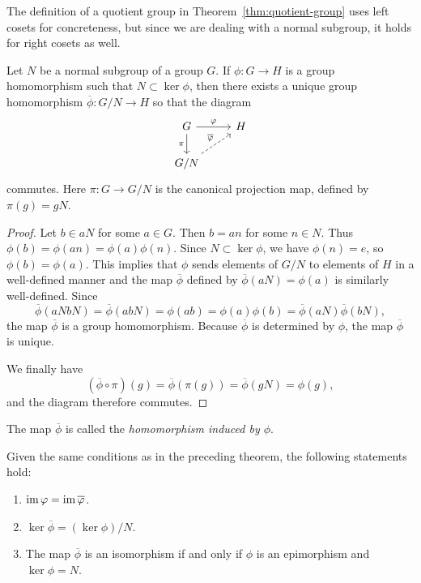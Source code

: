 \begin{remark}
    The definition of a quotient group in Theorem~\ref{thm:quotient-group} uses left cosets for concreteness, but since we are dealing with a normal subgroup, it holds for right cosets as well.
\end{remark}

\begin{theorem}
    \label{thm:induced-homomorphism}
    Let \(N\) be a normal subgroup of a group \(G\). If \(\phi: G \to H\) is a group homomorphism such that \(N \subset \ker \phi\), then there exists a unique group homomorphism \(\overline{\phi}: G/N \to H\) so that the diagram
    \[
        \begin{tikzcd}
            G \arrow{r}{\phi} \arrow[swap]{d}{\pi} & H \\
            G/N \arrow[dashed]{ur}{\overline{\phi}}
        \end{tikzcd}
    \]
    commutes. Here \(\pi: G \to G/N\) is the canonical projection map, defined by \(\pi(g) = gN\).
\end{theorem}

\begin{proof}
    Let \(b \in aN\) for some \(a \in G\). Then \(b = an\) for some \(n \in N\). Thus \(\phi(b) = \phi(an) = \phi(a)\phi(n)\). Since \(N \subset \ker \phi\), we have \(\phi(n) = e\), so \(\phi(b) = \phi(a)\). This implies that \(\phi\) sends elements of \(G/N\) to elements of \(H\) in a well-defined manner and the map \(\overline{\phi}\) defined by \(\overline{\phi}(aN) = \phi(a)\) is similarly well-defined. Since
    \[
    \overline{\phi}(aNbN) = \overline{\phi}(abN) = \phi(ab) = \phi(a)\phi(b) = \overline{\phi}(aN)\overline{\phi}(bN),
    \]
    the map \(\overline{\phi}\) is a group homomorphism. Because \(\overline{\phi}\) is determined by \(\phi\), the map \(\overline{\phi}\) is unique.

    We finally have
    \[
        (\overline{\phi} \circ \pi)(g) = \overline{\phi}(\pi(g)) = \overline{\phi}(gN) = \phi(g),
    \]
    and the diagram therefore commutes.
\end{proof}

\begin{remark}
    The map \(\overline{\phi}\) is called the \emph{homomorphism induced by \(\phi\)}.
\end{remark}

\begin{theorem}
    Given the same conditions as in the preceding theorem, the following statements hold:
    \begin{enumerate}[label=(\alph*)]
        \item \(\operatorname{im} \varphi = \operatorname{im} \overline{\varphi}\).
        \item \(\ker \overline{\phi} = (\ker \phi)/N\).
        \item The map \(\overline{\phi}\) is an isomorphism if and only if \(\phi\) is an epimorphism and \(\ker \phi = N\).
    \end{enumerate}
\end{theorem}

